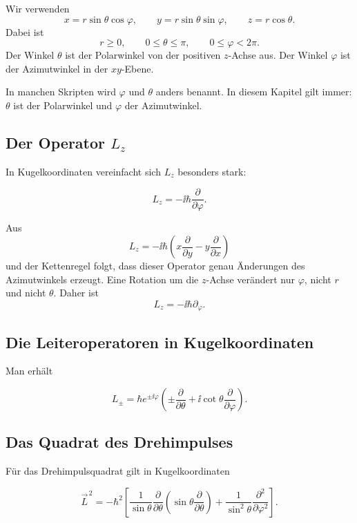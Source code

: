 Wir verwenden
\[
    x=r\sin\theta\cos\varphi,
    \qquad
    y=r\sin\theta\sin\varphi,
    \qquad
    z=r\cos\theta.
\]
Dabei ist
\[
    r\geq 0,
    \qquad
    0\leq \theta\leq \pi,
    \qquad
    0\leq \varphi<2\pi.
\]
Der Winkel \(\theta\) ist der Polarwinkel von der positiven \(z\)-Achse aus. Der Winkel \(\varphi\) ist der Azimutwinkel in der \(xy\)-Ebene.

\begin{warningbox}
In manchen Skripten wird \(\varphi\) und \(\theta\) anders benannt. In diesem Kapitel gilt immer: \(\theta\) ist der Polarwinkel und \(\varphi\) der Azimutwinkel.
\end{warningbox}

\subsection{Der Operator \(L_z\)}

In Kugelkoordinaten vereinfacht sich \(L_z\) besonders stark:
\begin{formulabox}
\[
    L_z=-\ii\hbar\frac{\partial}{\partial\varphi}.
\]
\end{formulabox}

\begin{derivationbox}
Aus
\[
    L_z=-\ii\hbar\left(x\frac{\partial}{\partial y}-y\frac{\partial}{\partial x}\right)
\]
und der Kettenregel folgt, dass dieser Operator genau Änderungen des Azimutwinkels erzeugt. Eine Rotation um die \(z\)-Achse verändert nur \(\varphi\), nicht \(r\) und nicht \(\theta\). Daher ist
\[
    L_z=-\ii\hbar\partial_\varphi.
\]
\end{derivationbox}

\subsection{Die Leiteroperatoren in Kugelkoordinaten}

Man erhält
\begin{formulabox}
\[
    L_\pm
    =\hbar e^{\pm\ii\varphi}
    \left(\pm\frac{\partial}{\partial\theta}
    +\ii\cot\theta\frac{\partial}{\partial\varphi}\right).
\]
\end{formulabox}

\subsection{Das Quadrat des Drehimpulses}

Für das Drehimpulsquadrat gilt in Kugelkoordinaten
\begin{formulabox}
\[
    \vec L^{\,2}
    =-\hbar^2\left[
    \frac{1}{\sin\theta}\frac{\partial}{\partial\theta}
    \left(\sin\theta\frac{\partial}{\partial\theta}\right)
    +\frac{1}{\sin^2\theta}\frac{\partial^2}{\partial\varphi^2}
    \right].
\]
\end{formulabox}

